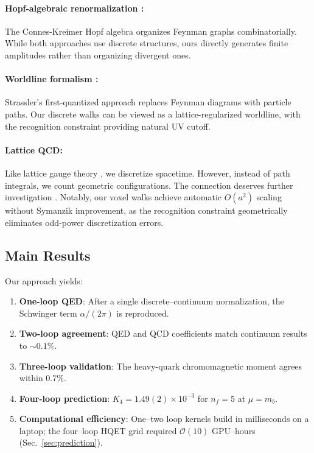 \documentclass[11pt,a4paper]{article}
\theoremstyle{definition}
\theoremstyle{remark}
\begin{document}
\paragraph{Hopf-algebraic renormalization \cite{Connes1998,Kreimer2000}:} The Connes-Kreimer Hopf algebra organizes Feynman graphs combinatorially. While both approaches use discrete structures, ours directly generates finite amplitudes rather than organizing divergent ones.

\paragraph{Worldline formalism \cite{Strassler1992,Schubert2001,Ahmadiniaz2021}:} Strassler's first-quantized approach replaces Feynman diagrams with particle paths. Our discrete walks can be viewed as a lattice-regularized worldline, with the recognition constraint providing natural UV cutoff.

\paragraph{Lattice QCD:} Like lattice gauge theory \cite{Wilson1974,Creutz1983}, we discretize spacetime. However, instead of path integrals, we count geometric configurations. The connection deserves further investigation \cite{Teper2009,Aoki2020}. Notably, our voxel walks achieve automatic $O(a^2)$ scaling without Symanzik improvement, as the recognition constraint geometrically eliminates odd-power discretization errors.

\subsection{Main Results}

Our approach yields:
\begin{enumerate}
\item \textbf{One-loop QED}: After a single discrete--continuum normalization, the Schwinger term $\alpha/(2\pi)$ is reproduced.
\item \textbf{Two-loop agreement}: QED and QCD coefficients match continuum results to $\sim 0.1\%$.
\item \textbf{Three-loop validation}: The heavy-quark chromomagnetic moment agrees within 0.7\%.
\item \textbf{Four-loop prediction}: $K_4 = 1.49(2) \times 10^{-3}$ for $n_f=5$ at $\mu=m_b$.
\item \textbf{Computational efficiency}: One–two loop kernels build in milliseconds on a laptop; the four–loop HQET grid required $\mathcal{O}(10)$ GPU–hours (Sec.~\ref{sec:prediction}).
\end{enumerate}
\end{document}

